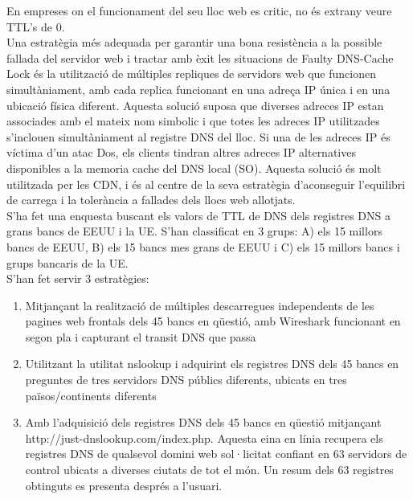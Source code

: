 \documentclass[a4paper, 10pt]{article}
\begin{document}
En empreses on el funcionament del seu lloc web es critic, no és extrany veure TTL's de 0.\\

Una estratègia més adequada per garantir una bona resistència a la possible fallada del servidor web i tractar amb èxit les situacions de Faulty DNS-Cache Lock és la utilització de múltiples repliques de servidors web que funcionen simultàniament, amb cada replica funcionant en una adreça IP única i en una ubicació física diferent. Aquesta solució suposa que diverses adreces IP estan associades amb el mateix nom simbolic i que totes les adreces IP utilitzades s’inclouen simultàniament al registre DNS del lloc. Si una de les adreces IP és víctima d’un atac Dos, els clients tindran altres adreces IP alternatives disponibles a la memoria cache del DNS local (SO). Aquesta solució és molt utilitzada per les CDN, i és al centre de la seva estratègia d’aconseguir l’equilibri de carrega i la tolerància a fallades dels llocs web allotjats.\\
\newpage
S’ha fet una enquesta buscant els valors de TTL de DNS dels registres DNS a grans bancs de EEUU i la UE. S’han classificat en 3 grups: A) els 15 millors bancs de EEUU, B) els 15 bancs mes grans de EEUU i C) els 15 millors bancs i grups bancaris de la UE.\\

S’han fet servir 3 estratègies:
\begin{enumerate}
\item Mitjançant la realització de múltiples descarregues independents de les pagines web frontals dels 45 bancs en qüestió, amb Wireshark funcionant en segon pla i capturant el transit DNS que passa
\item Utilitzant la utilitat nslookup i adquirint els registres DNS dels 45 bancs en preguntes de tres servidors DNS públics diferents, ubicats en tres països/continents diferents
\item Amb l’adquisició dels registres DNS dels 45 bancs en qüestió mitjançant http://just-dnslookup.com/index.php. Aquesta eina en línia recupera els registres DNS de qualsevol domini web sol·licitat confiant en 63 servidors de control ubicats a diverses ciutats de tot el món. Un resum dels 63 registres obtinguts es presenta després a l’usuari.
\end{enumerate}
\end{document}
